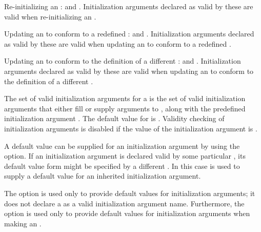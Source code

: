 \itemitem{--} Re-initializing an :
 and .
Initialization arguments declared as valid by these  are
valid when re-initializing an .

\itemitem{--}  Updating an  to conform to a redefined :
 and .
Initialization arguments declared as valid by these  are
valid when updating an  to conform to a redefined .

\itemitem{--} Updating an  to conform to the definition of a
different :
 and .
Initialization arguments declared as valid by these  are
valid when updating an  to conform to the definition
of a different .

\endlist
\endlist

The set of valid initialization arguments for a  is the set of
valid initialization arguments that either fill  or supply
arguments to , along with the predefined initialization
argument .  The default value for 
 is \nil.
Validity checking of initialization arguments is disabled if the value of
the initialization argument  is .

\endsubsection%


A default value  can be supplied for an initialization
argument by using the   option.  If an
initialization argument is declared valid by some particular ,
its default  value form might be specified by a different . 
In this case  is used to supply a default value
for an inherited initialization argument.

The  option is used only to provide default
values for initialization arguments; it does not declare a  
as a valid initialization argument name.  Furthermore, 
the  option is used only to provide default values for
initialization arguments when making an .
                     
